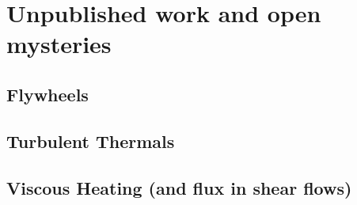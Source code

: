 \chapter{Unpublished work and open mysteries}
\label{ch:unpublished}

\section{Flywheels}

\section{Turbulent Thermals}

\section{Viscous Heating (and flux in shear flows)}

